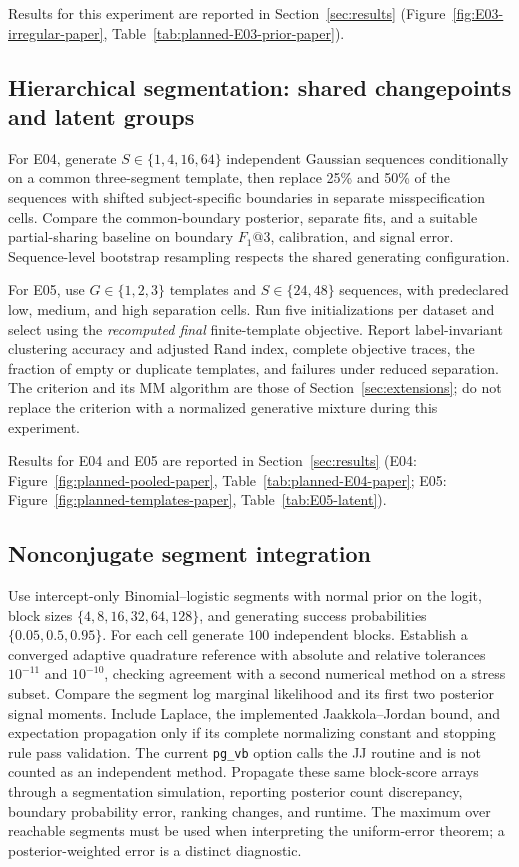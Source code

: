 Results for this experiment are reported in Section~\ref{sec:results}
(Figure~\ref{fig:E03-irregular-paper}, Table~\ref{tab:planned-E03-prior-paper}).

\subsection{Hierarchical segmentation: shared changepoints and latent groups}
For E04, generate $S\in\{1,4,16,64\}$ independent Gaussian sequences
conditionally on a common three-segment template, then replace 25\% and 50\%
of the sequences with shifted subject-specific boundaries in separate
misspecification cells. Compare the common-boundary posterior, separate fits,
and a suitable partial-sharing baseline on boundary $F_1@3$, calibration, and
signal error. Sequence-level bootstrap resampling respects the shared
generating configuration.

For E05, use $G\in\{1,2,3\}$ templates and $S\in\{24,48\}$ sequences, with
predeclared low, medium, and high separation cells. Run five initializations
per dataset and select using the \emph{recomputed final} finite-template
objective. Report label-invariant clustering accuracy and adjusted Rand index,
complete objective traces, the fraction of empty or duplicate templates, and
failures under reduced separation. The criterion and its MM algorithm are
those of Section~\ref{sec:extensions}; do not replace the criterion with a
normalized generative mixture during this experiment.

Results for E04 and E05 are reported in Section~\ref{sec:results}
(E04: Figure~\ref{fig:planned-pooled-paper}, Table~\ref{tab:planned-E04-paper};
E05: Figure~\ref{fig:planned-templates-paper}, Table~\ref{tab:E05-latent}).

\subsection{Nonconjugate segment integration}
Use intercept-only Binomial--logistic segments with normal prior on the logit,
block sizes $\{4,8,16,32,64,128\}$, and generating success probabilities
$\{0.05,0.5,0.95\}$. For each cell generate 100 independent blocks.
Establish a converged adaptive quadrature reference with absolute and relative
tolerances $10^{-11}$ and $10^{-10}$, checking agreement with a second numerical
method on a stress subset. Compare the segment log marginal likelihood and its
first two posterior signal moments. Include Laplace, the implemented
Jaakkola--Jordan bound, and expectation propagation only if its complete
normalizing constant and stopping rule pass validation. The current
\texttt{pg\_vb} option calls the JJ routine and is not counted as an
independent method. Propagate these same block-score arrays through a
segmentation simulation, reporting posterior count discrepancy, boundary
probability error, ranking changes, and runtime. The maximum over reachable
segments must be used when interpreting the uniform-error theorem; a
posterior-weighted error is a distinct diagnostic.

